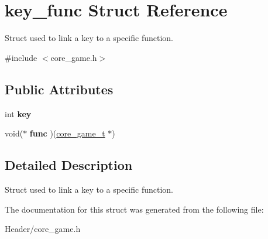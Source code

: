 \hypertarget{structkey__func}{}\section{key\+\_\+func Struct Reference}
\label{structkey__func}


Struct used to link a key to a specific function.  




{\ttfamily \#include $<$core\+\_\+game.\+h$>$}

\subsection*{Public Attributes}
\begin{DoxyCompactItemize}
\item 
\mbox{\label{structkey__func_a09cfd97fa7564fc1c4be7699df044136}} 
int {\bfseries key}
\item 
\mbox{\label{structkey__func_a1a1a3e9032310fa85d16914bb997dc44}} 
void($\ast$ {\bfseries func} )(\hyperlink{structcore__game__t}{core\+\_\+game\+\_\+t} $\ast$)
\end{DoxyCompactItemize}


\subsection{Detailed Description}
Struct used to link a key to a specific function. 

The documentation for this struct was generated from the following file\+:\begin{DoxyCompactItemize}
\item 
Header/core\+\_\+game.\+h\end{DoxyCompactItemize}
